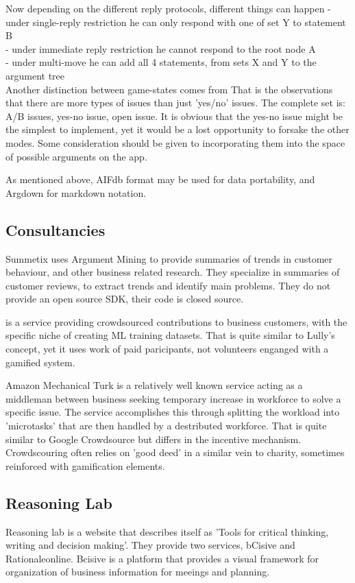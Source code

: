 \documentclass{report}
\begin{document}
Now depending on the different reply protocols, different things can happen
- under single-reply restriction he can only respond with one of set Y to statement B \\
- under immediate reply restriction he cannot respond to the root node A \\
- under multi-move he can add all 4 statements, from sets X and Y to the argument tree \\

Another distinction between game-states comes from \cite{wyner_argument_2015}
That is the observations that there are more types of issues than just 'yes/no' issues.
The complete set is: A/B issues, yes-no issue, open issue.
It is obvious that the yes-no issue might be the simplest to implement, yet it would be a lost opportunity to forsake the other modes.
Some consideration should be given to incorporating them into the space of possible arguments on the app.

As mentioned above, AIFdb format may be used for data portability, and Argdown for markdown notation.


\subsection{Consultancies}
Summetix \cite{schiller_stance_2021} uses Argument Mining to provide summaries of trends in customer behaviour, and other business related research. They specialize in summaries of customer reviews, to extract trends and identify main problems. They do not provide an open source SDK, their code is closed source.

\cite{noauthor_crowdee_nodate} is a service providing crowdsourced contributions to business customers, with the specific niche of creating ML training datasets. That is quite similar to Lully's concept, yet it uses work of paid paricipants, not volunteers enganged with a gamified system.

Amazon Mechanical Turk \cite{noauthor_amazon_nodate} is a relatively well known service acting as a middleman between business seeking temporary increase in workforce to solve a specific issue.
The service accomplishes this through splitting the workload into 'microtasks' that are then handled by a destributed workforce. That is quite similar to Google Crowdsource but differs in the incentive mechanism. Crowdscouring often relies on 'good deed' in a similar vein to charity, sometimes reinforced with gamification elements.

\subsection{Reasoning Lab}
Reasoning lab \cite{noauthor_argument_nodate} is a website that describes itself as 'Tools for critical thinking, writing and decision making'. They provide two services, bCisive and Rationaleonline.
Bcisive \cite{noauthor_bcisive_nodate} is a platform that provides a visual framework for organization of business information for meeings and planning.
\end{document}

